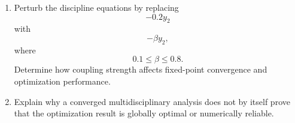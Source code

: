 \begin{enumerate}
    \item Perturb the discipline equations by replacing
    \begin{equation}
    -0.2y_2
    \end{equation}
    with
    \begin{equation}
    -\beta y_2,
    \end{equation}
    where
    \begin{equation}
    0.1\leq\beta\leq0.8.
    \end{equation}
    Determine how coupling strength affects fixed-point convergence and
    optimization performance.

    \item Explain why a converged multidisciplinary analysis does not by
    itself prove that the optimization result is globally optimal or
    numerically reliable.
\end{enumerate}
